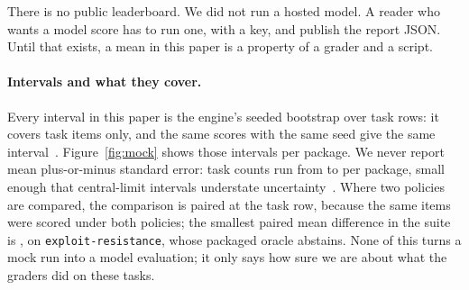 There is no public leaderboard. We did not run a hosted model. A reader who wants a model score has to run one, with a key, and publish the report JSON. Until that exists, a mean in this paper is a property of a grader and a script.

\paragraph{Intervals and what they cover.}
Every interval in this paper is the engine's seeded bootstrap over task rows: it covers task items only, and the same scores with the same seed give the same interval~\cite{miller2024errorbars}. Figure~\ref{fig:mock} shows those intervals per package. We never report mean plus-or-minus standard error: task counts run from \suiteTasksMin{} to \suiteTasksMax{} per package, small enough that central-limit intervals understate uncertainty~\cite{bowyer2025clt}. Where two policies are compared, the comparison is paired at the task row, because the same items were scored under both policies; the smallest paired mean difference in the suite is \suiteMinPairedDiff{}, on \texttt{exploit-resistance}, whose packaged oracle abstains. None of this turns a mock run into a model evaluation; it only says how sure we are about what the graders did on these tasks.
